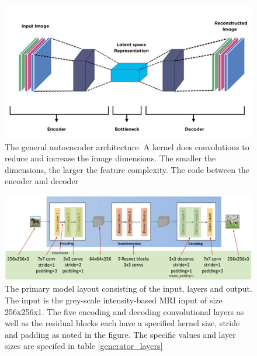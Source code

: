 \documentclass[12pt, fleqn, titlepage]{article}
\begin{document}
\begin{figure}[H]
	\centering
	\includegraphics[width=0.7\linewidth]{imgs/autoencoder}
	\caption{The general autoencoder architecture. A kernel does convolutions to reduce and increase the image dimensions. The smaller the dimensions, the larger the feature complexity. The code between the encoder and decoder } %
	\label{fig:autoencoder}
\end{figure}


\begin{figure}[H]
	\centering
	\includegraphics[width=0.7\linewidth]{imgs/cyclegan_generator_layers}
	\caption{The primary model layout consisting of the input, layers and output. The input is the grey-scale intensity-based MRI input of size 256x256x1. The five encoding and decoding convolutional layers as well as the residual blocks each have a specified kernel size, stride and padding as noted in the figure. The specific values and layer sizes are specifed in table \ref{generator_layers}}
	\label{fig:cyclegangeneratorlayers}
\end{figure}
\end{document}
